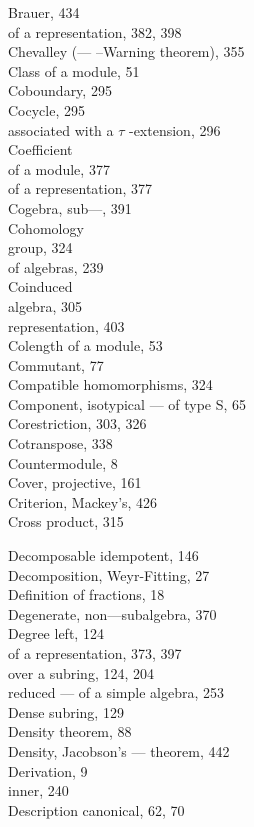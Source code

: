 Brauer, 434\\
of a representation, 382, 398\\
Chevalley (--- --Warning theorem), 355\\
Class of a module, 51\\
Coboundary, 295\\
Cocycle, 295\\
associated with a \(\tau\) -extension, 296\\
Coefficient\\
of a module, 377\\
of a representation, 377\\
Cogebra, sub---, 391\\
Cohomology\\
group, 324\\
of algebras, 239\\
Coinduced\\
algebra, 305\\
representation, 403\\
Colength of a module, 53\\
Commutant, 77\\
Compatible homomorphisms, 324\\
Component, isotypical --- of type S, 65\\
Corestriction, 303, 326\\
Cotranspose, 338\\
Countermodule, 8\\
Cover, projective, 161\\
Criterion, Mackey's, 426\\
Cross product, 315


Decomposable idempotent, 146\\
Decomposition, Weyr-Fitting, 27\\
Definition of fractions, 18\\
Degenerate, non---subalgebra, 370\\
Degree left, 124\\
of a representation, 373, 397\\
over a subring, 124, 204\\
reduced --- of a simple algebra, 253\\
Dense subring, 129\\
Density theorem, 88\\
Density, Jacobson's --- theorem, 442\\
Derivation, 9\\
inner, 240\\
Description canonical, 62, 70

